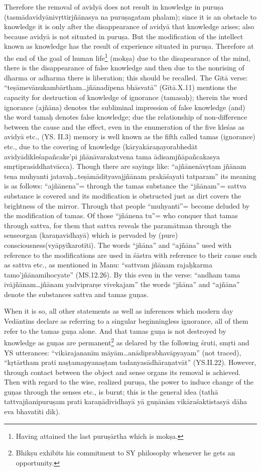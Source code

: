 Therefore the removal of avidyā does not result in knowledge in puruṣa  (tasmādavidyānivṛttirjñānasya na puruṣagatam phalam); since it is an obstacle to knowledge it is only after the disappearance of avidyā that knowledge arises; also because avidyā is not situated in puruṣa.  But the modification of the intellect known as knowledge has the result of experience situated in puruṣa. Therefore at the end of the goal of human life\footnote{Having attained the last puruṣārtha which is mokṣa.} (mokṣa) due to the disapearance of the mind, there is the disappearance of false knowledge and then due to the nonrising of dharma or adharma there is liberation; this should be recalled. The Gītā verse: “teṣāmevānukambārtham…jñānadīpena bhāsvatā” (Gītā.\-X.11) mentions the capacity for destruction of knowledge of ignorance (tamasaḥ); therein the word ignorance (ajñāna) denotes the subliminal impression of false knowledge (and) the word tamaḥ denotes false knowledge; due the relationship of non-difference between the cause and the effect, even in the enumeration of the five kleśas as avidyā etc., (YS. II.3) memory is well known as the fifth called tamas (ignorance) etc., due to the covering of knowledge   (kāryakāraṇayorabhedāt avidyādikleśapañcake’pi jñānāvarakatvena tama ādisamjñāpañcakasya smṛtiprasiddhatvācca). Though there are sayings like: “ajñānenāvṛtam jñānam tena muhyanti jatavaḥ…teṣāmādityavajjñānam prakāśayati tatparam” its meaning is as follows: “ajñānena”= through the tamas substance the “jñānam”= sattva substance is covered and its modification is obstructed just as dirt covers the brightness of the mirror.  Through that people “muhyanti”= become deluded by the modification of tamas. Of those “jñānena tu”= who conquer that tamas through sattva, for them that sattva reveals the paramātman through the sense\break organ (karaṇavidhayā) which is pervaded by (pure) consciousness\break (vyāpyīkarotīti). The words “jñāna” and “ajñāna” used with reference to the modifications are used in śāstra with reference to their cause such as sattva etc., as mentioned in Manu: “sattvam jñānam rajaḥ\break karma tamo’jñānamihocyate” (MS.12.26). By this even in the verse: “andham tama ivājñānam…jñānam yadviprarṣe vivekajam” the words “jñāna” and “ajñāna” denote the substances sattva and tamas guṇas.

\eject

When it is so, all other statements as well as inferences which modern day Vedāntins declare as referring to a singular beginningless ignorance, all of them refer to the tamas guṇa alone. And that tamas guṇa is not destroyed by knowledge as guṇas are permanent\footnote{Bhikṣu exhibits his commitment to SY philosophy whenever he gets an opportunity.} as delared by the following śruti, smṛti and YS utterances: “vikārajananīm māyām…anādiprabhavāpyayam” (not traced), “kṛtārtham prati naṣṭamapyanaṣṭam tadanyasādhāraṇatvāt” (YS.II.22). However, through contact between the object and sense organs its removal is achieved. Then with regard to the wise, realized puruṣa, the power to induce change of the guṇas through the senses etc., is burnt; this is the general idea (tathā tattvajñanipuruṣam prati karaṇādividhayā yā guṇānām vikāraśaktistasyā dāha eva bhavatīti dik).

